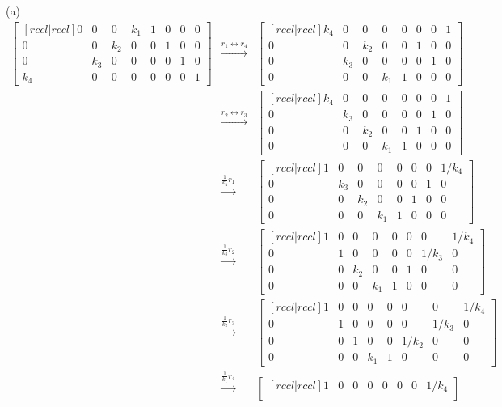 \begin{solution}
(a)
\begin{eqnarray*}
\begin{bmatrix}[rccl|rccl]
0&0&0&k_1&1&0&0&0\\
0&0&k_2&0&0&1&0&0\\
0&k_3&0&0&0&0&1&0\\
k_4&0&0&0&0&0&0&1
\end{bmatrix}
&\xrightarrow[]{r_1 \leftrightarrow r_4}&
\begin{bmatrix}[rccl|rccl]
k_4&0&0&0&0&0&0&1\\
0&0&k_2&0&0&1&0&0\\
0&k_3&0&0&0&0&1&0\\
0&0&0&k_1&1&0&0&0
\end{bmatrix}\\
&\xrightarrow[]{r_2 \leftrightarrow r_3}&
\begin{bmatrix}[rccl|rccl]
k_4&0&0&0&0&0&0&1\\
0&k_3&0&0&0&0&1&0\\
0&0&k_2&0&0&1&0&0\\
0&0&0&k_1&1&0&0&0
\end{bmatrix}\\
&\xrightarrow[]{\frac{1}{k_4}r_1}&
\begin{bmatrix}[rccl|rccl]
1&0&0&0&0&0&0&1/k_4\\
0&k_3&0&0&0&0&1&0\\
0&0&k_2&0&0&1&0&0\\
0&0&0&k_1&1&0&0&0
\end{bmatrix}\\
&\xrightarrow[]{\frac{1}{k_3}r_2}&
\begin{bmatrix}[rccl|rccl]
1&0&0&0&0&0&0&1/k_4\\
0&1&0&0&0&0&1/k_3&0\\
0&0&k_2&0&0&1&0&0\\
0&0&0&k_1&1&0&0&0
\end{bmatrix}\\
&\xrightarrow[]{\frac{1}{k_2}r_3}&
\begin{bmatrix}[rccl|rccl]
1&0&0&0&0&0&0&1/k_4\\
0&1&0&0&0&0&1/k_3&0\\
0&0&1&0&0&1/k_2&0&0\\
0&0&0&k_1&1&0&0&0
\end{bmatrix}\\
&\xrightarrow[]{\frac{1}{k_1}r_4}&
\begin{bmatrix}[rccl|rccl]
1&0&0&0&0&0&0&1/k_4\\

\end{bmatrix}
\end{eqnarray*}
\end{solution}
